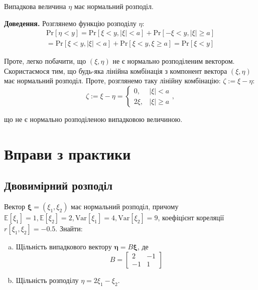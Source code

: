 \documentclass{hw_template}
\begin{document}
\begin{lemma}
    Випадкова величина $\eta$ має нормальний розподіл.
\end{lemma}

\textbf{Доведення.} Розглянемо функцію розподілу $\eta$:
\begin{align*}
    \text{Pr}[\eta < y] = \text{Pr}[\xi < y, |\xi| < a] + \text{Pr}[-\xi < y, |\xi| \geq a] \\= \text{Pr}[\xi < y, |\xi| < a] + \text{Pr}[\xi < y, \xi \geq a] = \text{Pr}[\xi < y]
\end{align*}

Проте, легко побачити, що $(\xi,\eta)$ не є нормально розподіленим вектором. Скористаємося тим, що будь-яка лінійна комбінація з компонент вектора $(\xi,\eta)$ має нормальний розподіл. Проте, розглянемо таку лінійну комбінацію: $\zeta := \xi-\eta$:
\begin{equation*}
    \zeta := \xi - \eta = \begin{cases}
        0, & |\xi| < a \\
        2\xi, & |\xi| \geq a
    \end{cases},
\end{equation*} 

що не є нормально розподіленою випадковою величиною.

\pagebreak

\section{Вправи з практики}

\subsection{Двовимірний розподіл}

\begin{problem}
    Вектор $\boldsymbol{\xi} = (\xi_1,\xi_2)$ має нормальний розподіл, причому $\mathbb{E}[\xi_1]=1,\mathbb{E}[\xi_2]=2,\text{Var}[\xi_1]=4,\text{Var}[\xi_2]=9$, коефіцієнт кореляції $r[\xi_1,\xi_2]=-0.5$. Знайти:
    \begin{enumerate}[(a)]
        \item Щільність випадкового вектору $\boldsymbol{\eta} = B\boldsymbol{\xi}$, де
        \begin{equation*}
            B = \begin{bmatrix}
                2 & -1 \\ -1 & 1
            \end{bmatrix}
        \end{equation*}
        \item Щільність розподілу $\eta = 2\xi_1 - \xi_2$.
    \end{enumerate}
\end{problem}
\end{document}
